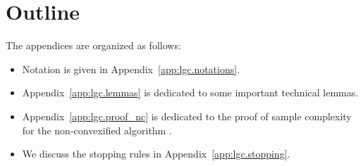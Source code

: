 \section{Outline}\label{app:lgc.outline}

The appendices are organized as follows:
\begin{itemize}[label=$\square$]
    \item Notation is given in Appendix~\ref{app:lgc.notations}. 
    \item Appendix~\ref{app:lgc.lemmas} is dedicated to some important technical lemmas.
    \item Appendix~\ref{app:lgc.proof_nc} is dedicated to the proof of sample complexity for the non-convexified algorithm \LG.
    \item We discuss the stopping rules in Appendix~\ref{app:lgc.stopping}.
\end{itemize}
